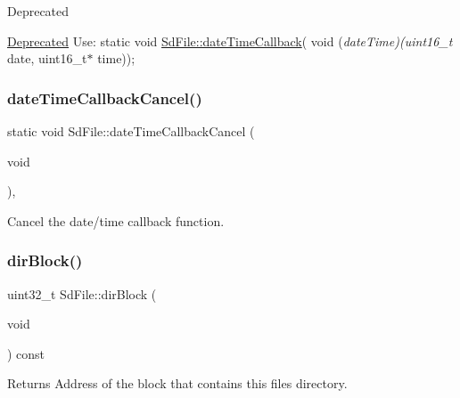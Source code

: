 \begin{DoxyRefDesc}{Deprecated}
\item[\hyperlink{deprecated__deprecated000003}{Deprecated}]Use\+: static void \hyperlink{class_sd_file_a2d78e6a8cedbf8ce545af68457b43bf1}{Sd\+File\+::date\+Time\+Callback}( void ({\itshape date\+Time)(uint16\+\_\+t} date, uint16\+\_\+t$\ast$ time)); \end{DoxyRefDesc}
\mbox{\label{class_sd_file_adaec83fdbd8473a8e336e27b8622f673}} 
\subsubsection{\texorpdfstring{date\+Time\+Callback\+Cancel()}{dateTimeCallbackCancel()}}
{\footnotesize\ttfamily static void Sd\+File\+::date\+Time\+Callback\+Cancel (\begin{DoxyParamCaption}\item[{void}]{ }\end{DoxyParamCaption})\hspace{0.3cm}{\ttfamily [inline]}, {\ttfamily [static]}}

Cancel the date/time callback function. \mbox{\label{class_sd_file_af62898865cfe9a97ce75468efc0d2409}} 
\subsubsection{\texorpdfstring{dir\+Block()}{dirBlock()}}
{\footnotesize\ttfamily uint32\+\_\+t Sd\+File\+::dir\+Block (\begin{DoxyParamCaption}\item[{void}]{ }\end{DoxyParamCaption}) const\hspace{0.3cm}{\ttfamily [inline]}}

\begin{DoxyReturn}{Returns}
Address of the block that contains this file\textquotesingle{}s directory. 
\end{DoxyReturn}
\mbox{\label{class_sd_file_abaf9b1dc12d53cdeb937065edf68927d}} 
